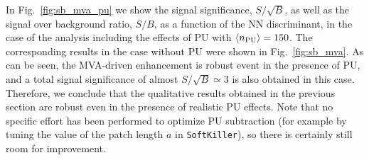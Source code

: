 In Fig.~\ref{fig:sb_mva_pu} we show the signal significance,
$S/\sqrt{B}$, as well as the signal over background ratio,
$S/B$, as a function of the NN discriminant, in the case
of the analysis including the effects of PU
with $\left\langle n_{\rm PU}\right\rangle=150$.
%
The corresponding results in the case without PU were shown in
Fig.~\ref{fig:sb_mva}.
%
As can be seen, the MVA-driven enhancement is robust event in the
presence of PU, and a total signal significance of
almost $S/\sqrt{B}\simeq 3$ is also obtained in this case.
%
Therefore, we conclude that the qualitative results obtained
in the previous section are robust even in the presence
of realistic PU effects.
%
Note that no specific effort has been performed to
optimize PU subtraction (for example by tuning the value
of the patch length $a$ in {\tt SoftKiller}), so there is
certainly still room for improvement.
